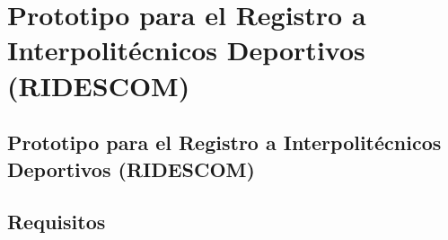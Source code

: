 \chapter{Prototipo para el Registro a Interpolit\'ecnicos Deportivos (RIDESCOM)}
	
	
	\section{Prototipo para el Registro a Interpolit\'ecnicos Deportivos (RIDESCOM)}
	
	
	\section{Requisitos}
	
	
	
	
	
	
	
